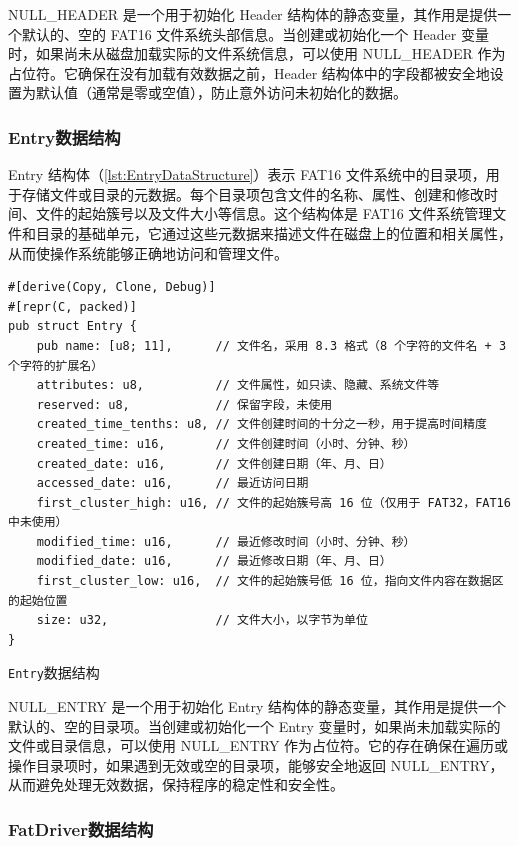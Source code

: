 NULL\_HEADER 是一个用于初始化 Header 结构体的静态变量，其作用是提供一个默认的、空的 FAT16 文件系统头部信息。当创建或初始化一个 Header 变量时，如果尚未从磁盘加载实际的文件系统信息，可以使用 NULL\_HEADER 作为占位符。它确保在没有加载有效数据之前，Header 结构体中的字段都被安全地设置为默认值（通常是零或空值），防止意外访问未初始化的数据。

\subsubsection{Entry数据结构}

Entry 结构体（\cref{lst:EntryDataStructure}）表示 FAT16 文件系统中的目录项，用于存储文件或目录的元数据。每个目录项包含文件的名称、属性、创建和修改时间、文件的起始簇号以及文件大小等信息。这个结构体是 FAT16 文件系统管理文件和目录的基础单元，它通过这些元数据来描述文件在磁盘上的位置和相关属性，从而使操作系统能够正确地访问和管理文件。

\begin{listing}[htbp]
    \begin{verbatim}
#[derive(Copy, Clone, Debug)]
#[repr(C, packed)]
pub struct Entry {
    pub name: [u8; 11],      // 文件名，采用 8.3 格式（8 个字符的文件名 + 3 个字符的扩展名）
    attributes: u8,          // 文件属性，如只读、隐藏、系统文件等
    reserved: u8,            // 保留字段，未使用
    created_time_tenths: u8, // 文件创建时间的十分之一秒，用于提高时间精度
    created_time: u16,       // 文件创建时间（小时、分钟、秒）
    created_date: u16,       // 文件创建日期（年、月、日）
    accessed_date: u16,      // 最近访问日期
    first_cluster_high: u16, // 文件的起始簇号高 16 位（仅用于 FAT32，FAT16 中未使用）
    modified_time: u16,      // 最近修改时间（小时、分钟、秒）
    modified_date: u16,      // 最近修改日期（年、月、日）
    first_cluster_low: u16,  // 文件的起始簇号低 16 位，指向文件内容在数据区的起始位置
    size: u32,               // 文件大小，以字节为单位
}
    \end{verbatim}
    \caption{\texttt{Entry}数据结构}\label{lst:EntryDataStructure}
\end{listing}

NULL\_ENTRY 是一个用于初始化 Entry 结构体的静态变量，其作用是提供一个默认的、空的目录项。当创建或初始化一个 Entry 变量时，如果尚未加载实际的文件或目录信息，可以使用 NULL\_ENTRY 作为占位符。它的存在确保在遍历或操作目录项时，如果遇到无效或空的目录项，能够安全地返回 NULL\_ENTRY，从而避免处理无效数据，保持程序的稳定性和安全性。

\subsubsection{FatDriver数据结构}


